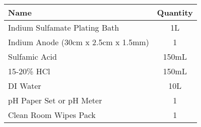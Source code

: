 \begin{center}
\begin{framed}
\begin{minipage}{0.8\textwidth}
\begin{center}
            \vspace{0.5cm}

            \begin{tabular}{|l|c|}
                \hline
                \textbf{Name} & \textbf{Quantity} \\
                \hline
                Indium Sulfamate Plating Bath        & 1L \\
                Indium Anode (30cm x 2.5cm x 1.5mm)  & 1 \\
                Sulfamic Acid                        & 150mL \\
                15-20\% HCl                          & 150mL \\
                DI Water                             & 10L \\
                pH Paper Set or pH Meter             & 1 \\
                Clean Room Wipes Pack                & 1 \\
                \hline
            \end{tabular}

            \end{center}

        \end{minipage}
    \end{framed}
\end{center}


